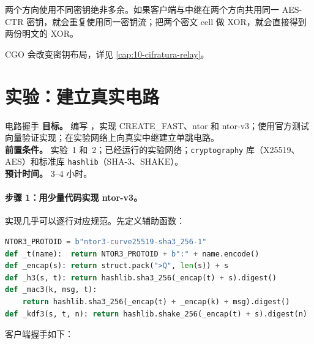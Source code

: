 两个方向使用不同密钥绝非多余。如果客户端与中继在两个方向共用同一 AES-CTR 密钥，就会重复使用同一密钥流；把两个密文 cell 做 XOR，就会直接得到两份明文的 XOR。

CGO 会改变密钥布局，详见 \cref{cap:10-cifratura-relay}。

\section{实验：建立真实电路}\label{sec:lab-circuiti}

\begin{laboratorio}[3]{电路握手}
\textbf{目标。} 编写 ，实现 CREATE\_FAST、ntor 和 ntor-v3；使用官方测试向量验证实现；在实验网络上向真实中继建立单跳电路。\\
\textbf{前置条件。} 实验~1 和~2；已经运行的实验网络；\texttt{cryptography} 库（X25519、AES）和标准库 \texttt{hashlib}（SHA-3、SHAKE）。\\
\textbf{预计时间。} 3--4 小时。
\end{laboratorio}

\paragraph{步骤 1：用少量代码实现 ntor-v3。} 实现几乎可以逐行对应规范。先定义辅助函数：

\begin{lstlisting}[language=Python]
NTOR3_PROTOID = b"ntor3-curve25519-sha3_256-1"
def _t(name):  return NTOR3_PROTOID + b":" + name.encode()
def _encap(s): return struct.pack(">Q", len(s)) + s
def _h3(s, t): return hashlib.sha3_256(_encap(t) + s).digest()
def _mac3(k, msg, t):
    return hashlib.sha3_256(_encap(t) + _encap(k) + msg).digest()
def _kdf3(s, t, n): return hashlib.shake_256(_encap(t) + s).digest(n)
\end{lstlisting}

客户端握手如下：

